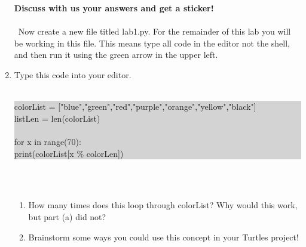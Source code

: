\documentclass[11pt, letterpaper, onecolumn, oneside, final]{article}
\begin{document}
\begin{enumerate}
\begin{enumerate}
\end{enumerate}
\textbf{Discuss with us your answers and get a sticker!}
\\\\\
Now create a new file titled {\consolas lab1.py}. For the remainder of this lab you will be working in this file. This means type all code in the editor not the shell, and then run it using the green arrow in the upper left. 
\item Type this code into your editor.\\
\\
    \colorbox{lightgray}{\parbox{.88\textwidth}{\consolas colorList = ["blue","green","red","purple","orange","yellow","black"]\\
    listLen = len(colorList)\\
    \\
    for x in range(70):\\
    \hspace*{6mm} print(colorList[x \% colorLen])}}\\
    \\
    \begin{enumerate}
        \item 
    How many times does this loop through {\consolas colorList}? Why would this work, but part (a) did not? \\
    \item
    Brainstorm some ways you could use this concept in your Turtles project!\\
    \\
    \end{enumerate}
    

\end{enumerate}
\end{document}
